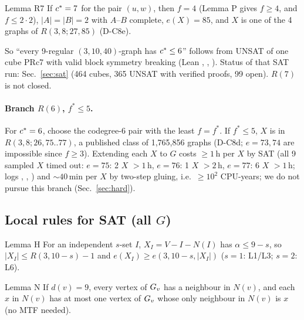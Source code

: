 \begin{namedthm}{Lemma R7}
If $c^{*} = 7$ for the pair $(u, w)$, then $f = 4$ (Lemma P gives $f \ge 4$, and $f \le 2 \cdot 2$), $|A| = |B| = 2$ with
$A$--$B$ complete, $e(X) = 85$, and $X$ is one of the 4 graphs of $R(3,8;27,85)$ (D-C8e).
\end{namedthm}
So ``every 9-regular $(3,10,40)$-graph has $c^{*} \le 6$'' follows from UNSAT of one cube PRc7 with valid block symmetry
breaking (Lean , , ). Status of that SAT run: Sec.~\ref{sec:sat}
(464 cubes, 365 UNSAT with verified proofs, 99 open). $R(7)$ is not closed.

\paragraph{Branch $R(6)$, $f^* \le 5$.} For $c^{*} = 6$, choose the codegree-6 pair with the least $f = f^*$. If $f^* \le 5$, $X$ is in
$R(3,8;26,75..77)$, a published class of 1,765,856 graphs (D-C8d; $e = 73, 74$ are impossible since $f \ge 3$).
Extending each $X$ to $G$ costs $\ge 1$\,h per $X$ by SAT (all 9 sampled $X$ timed out: $e = 75$: 2 $X$ $> 1$\,h, $e = 76$: 1 $X$ $> 2$\,h,
$e = 77$: 6 $X$ $> 1$\,h; logs , , ) and ${\sim}40$\,min per $X$ by two-step gluing,
i.e.\ $\ge 10^{2}$ CPU-years; we do not pursue this branch (Sec.~\ref{sec:hard}). 

\subsection{Local rules for SAT (all \texorpdfstring{$G$}{G})}\label{sec:local}
\begin{namedthm}{Lemma H}
For an independent $s$-set $I$, $X_I = V - I - N(I)$ has $\alpha \le 9 - s$, so $|X_I| \le R(3,10-s) - 1$ and
$e(X_I) \ge e(3,10-s,|X_I|)$ ($s = 1$: L1/L3; $s = 2$: L6).
\end{namedthm}

\begin{namedthm}{Lemma N}
If $d(v) = 9$, every vertex of $G_{v}$ has a neighbour in $N(v)$, and each $x$ in $N(v)$ has at most one vertex of
$G_{v}$ whose only neighbour in $N(v)$ is $x$ (no MTF needed).
\end{namedthm}

